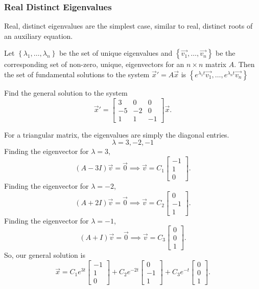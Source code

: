 \subsubsection{Real Distinct Eigenvalues}
\noindent
Real, distinct eigenvalues are the simplest case, similar to real, distinct roots of an auxiliary equation.
\begin{theorem}
	Let $\left\{\lambda_1, \ldots, \lambda_n\right\}$ be the set of unique eigenvalues and $\left\{\vec{v_1}, \ldots, \vec{v_n}\right\}$ be the corresponding set of non-zero, unique, eigenvectors for an $n \times n$ matrix $A$. Then the set of fundamental solutions to the system $\vec{x}' = A\vec{x}$ is $\left\{e^{\lambda_1 t}\vec{v_1}, \ldots, e^{\lambda_n t}\vec{v_n} \right\}$
\end{theorem}

\begin{example}
	Find the general solution to the system
	\begin{equation*}
		\vec{x}' = \begin{bmatrix}
			3 & 0 & 0 \\
			-5 & -2 & 0 \\
			1 & 1 & -1
		\end{bmatrix} \vec{x}.
	\end{equation*}
\end{example}
\noindent
For a triangular matrix, the eigenvalues are simply the diagonal entries.
\begin{equation*}
	\lambda = 3, -2, -1
\end{equation*}
Finding the eigenvector for $\lambda = 3$,
\begin{equation*}
	(A - 3I)\vec{v} = \vec{0} \implies \vec{v} = C_1\begin{bmatrix}
		-1 \\
		1 \\
		0
	\end{bmatrix}.
\end{equation*}
Finding the eigenvector for $\lambda = -2$,
\begin{equation*}
	(A + 2I)\vec{v} = \vec{0} \implies \vec{v} = C_2\begin{bmatrix}
		0 \\
		-1 \\
		1
	\end{bmatrix}.
\end{equation*}
Finding the eigenvector for $\lambda = -1$,
\begin{equation*}
	(A + I)\vec{v} = \vec{0} \implies \vec{v} = C_3\begin{bmatrix}
		0 \\
		0 \\
		1
	\end{bmatrix}.
\end{equation*}
So, our general solution is
\begin{equation*}
	\vec{x} = C_1e^{3t}\begin{bmatrix}
		-1 \\
		1 \\
		0
	\end{bmatrix} + C_2e^{-2t}\begin{bmatrix}
		0 \\
		-1 \\
		1
	\end{bmatrix} + C_3e^{-t}\begin{bmatrix}
		0 \\
		0 \\
		1
	\end{bmatrix}.
\end{equation*}